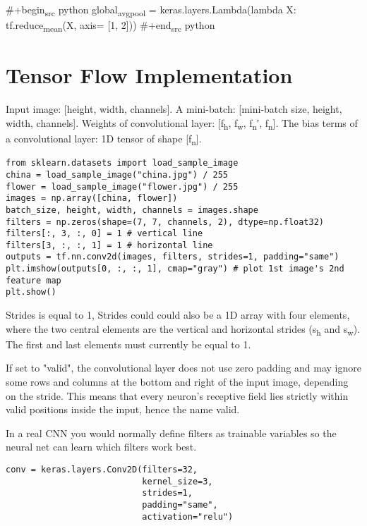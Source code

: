 \documentclass[11pt]{article}
\begin{document}
\#+begin\textsubscript{src}  python
global\textsubscript{avg}\textsubscript{pool} = keras.layers.Lambda(lambda X: tf.reduce\textsubscript{mean}(X, axis= [1, 2]))
\#+end\textsubscript{src}  python

\section{Tensor Flow Implementation}
\label{sec:org3b8a64c}
Input image: [height, width, channels]. 
A mini-batch: [mini-batch size, height, width, channels]. 
Weights of convolutional layer: [f\textsubscript{h}, f\textsubscript{w}, f\textsubscript{n}′, f\textsubscript{n}].
The bias terms of a convolutional layer:  1D tensor of shape [f\textsubscript{n}].

\begin{verbatim}
from sklearn.datasets import load_sample_image
china = load_sample_image("china.jpg") / 255
flower = load_sample_image("flower.jpg") / 255
images = np.array([china, flower])
batch_size, height, width, channels = images.shape
filters = np.zeros(shape=(7, 7, channels, 2), dtype=np.float32)
filters[:, 3, :, 0] = 1 # vertical line
filters[3, :, :, 1] = 1 # horizontal line
outputs = tf.nn.conv2d(images, filters, strides=1, padding="same")
plt.imshow(outputs[0, :, :, 1], cmap="gray") # plot 1st image's 2nd
feature map
plt.show()
\end{verbatim}

Strides is equal to 1, 
Strides could could also be a 1D array with four elements, 
where the two central elements are the vertical and horizontal strides 
(s\textsubscript{h} and s\textsubscript{w}). 
The first and last elements must currently be equal to 1.

If set to "valid", the convolutional layer does not use zero padding and may
ignore some rows and columns at the bottom and right of the input image,
depending on the stride. This means that every neuron’s receptive field lies
strictly within valid positions inside the input, hence the name valid.

In a real CNN you would normally define filters as trainable variables so 
the neural net can learn which filters work best.

\begin{verbatim}
conv = keras.layers.Conv2D(filters=32, 
                           kernel_size=3, 
                           strides=1,
                           padding="same", 
                           activation="relu")
\end{verbatim}
\end{document}
